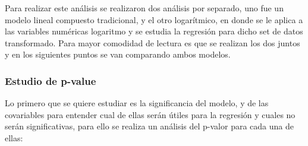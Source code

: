 Para realizar este análisis se realizaron dos análisis por separado, uno fue un modelo lineal compuesto tradicional, y el otro logarítmico, en donde se le aplica a las variables numéricas logaritmo y se estudia la regresión para dicho set de datos transformado.
Para mayor comodidad de lectura es que se realizan los dos juntos y en los siguientes puntos se van comparando ambos modelos.\\


\subsubsection{Estudio de p-value}

Lo primero que se quiere estudiar es la significancia del modelo, y de las covariables para entender cual de ellas serán útiles para la regresión y cuales no serán significativas, para ello se realiza un análisis del p-valor para cada una de ellas:\\



